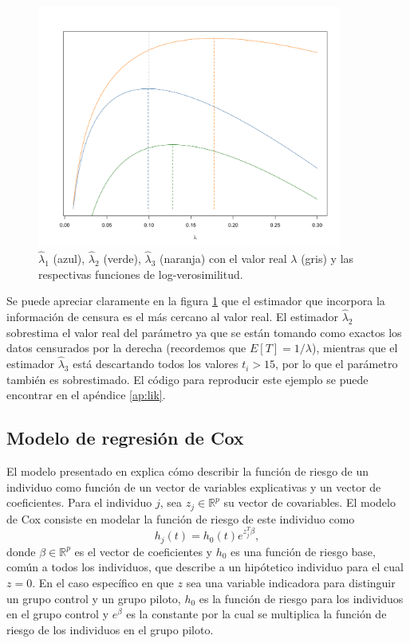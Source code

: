 \documentclass[11pt,a4paper]{article}
\begin{document}
\begin{figure}[h]
\centering\includegraphics[width=10cm]{likelihood.png}
\caption{$\hat{\lambda}_1$ (azul), $\hat{\lambda}_2$ (verde), $\hat{\lambda}_3$ (naranja) con el valor real $\lambda$ (gris) y las respectivas funciones de log-verosimilitud.}
\label{fig:lik}
\end{figure}

Se puede apreciar claramente en la figura \ref{fig:lik} que el estimador que incorpora la información de censura es el más cercano al valor real. El estimador $\hat{\lambda}_2$ sobrestima el valor real del parámetro ya que se están tomando como exactos los datos censurados por la derecha (recordemos que $E[T] = 1/\lambda$), mientras que el estimador $\hat{\lambda}_3$ está descartando todos los valores $t_i > 15$, por lo que el parámetro también es sobrestimado. El código para reproducir este ejemplo se puede encontrar en el apéndice \ref{ap:lik}.

\subsection{Modelo de regresión de Cox}
\label{seccion_coxph}
El modelo presentado en \citet{cox} explica cómo describir la función de riesgo de un individuo como función de un vector de variables explicativas y un vector de coeficientes. Para el individuo $j$, sea $z_j\in \mathbb{R}^p$ su vector de covariables. El modelo de Cox consiste en modelar la función de riesgo de este individuo como
\begin{equation} \label{cox_ph}
h_j(t) = h_0(t)e^{z_j^T\beta},
\end{equation}
donde $\beta\in \mathbb{R}^p$ es el vector de coeficientes y $h_0$ es una función de riesgo base, común a todos los individuos, que describe a un hipótetico individuo para el cual $z = 0$. En el caso específico en que $z$ sea una variable indicadora para distinguir un grupo control y un grupo piloto, $h_0$ es la función de riesgo para los individuos en el grupo control y $e^\beta$ es la constante por la cual se multiplica la función de riesgo de los individuos en el grupo piloto.\\
\end{document}
